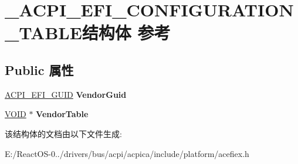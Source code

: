 \hypertarget{struct___a_c_p_i___e_f_i___c_o_n_f_i_g_u_r_a_t_i_o_n___t_a_b_l_e}{}\section{\+\_\+\+A\+C\+P\+I\+\_\+\+E\+F\+I\+\_\+\+C\+O\+N\+F\+I\+G\+U\+R\+A\+T\+I\+O\+N\+\_\+\+T\+A\+B\+L\+E结构体 参考}
\label{struct___a_c_p_i___e_f_i___c_o_n_f_i_g_u_r_a_t_i_o_n___t_a_b_l_e}
\subsection*{Public 属性}
\begin{DoxyCompactItemize}
\item 
\mbox{\label{struct___a_c_p_i___e_f_i___c_o_n_f_i_g_u_r_a_t_i_o_n___t_a_b_l_e_a5563075a7ea9d1383a69a4ba67926057}} 
\hyperlink{struct_a_c_p_i___e_f_i___g_u_i_d}{A\+C\+P\+I\+\_\+\+E\+F\+I\+\_\+\+G\+U\+ID} {\bfseries Vendor\+Guid}
\item 
\mbox{\label{struct___a_c_p_i___e_f_i___c_o_n_f_i_g_u_r_a_t_i_o_n___t_a_b_l_e_a7b7f2eabbb6623730c7d85cb8e9c9482}} 
\hyperlink{interfacevoid}{V\+O\+ID} $\ast$ {\bfseries Vendor\+Table}
\end{DoxyCompactItemize}


该结构体的文档由以下文件生成\+:\begin{DoxyCompactItemize}
\item 
E\+:/\+React\+O\+S-\/0../drivers/bus/acpi/acpica/include/platform/acefiex.\+h\end{DoxyCompactItemize}
